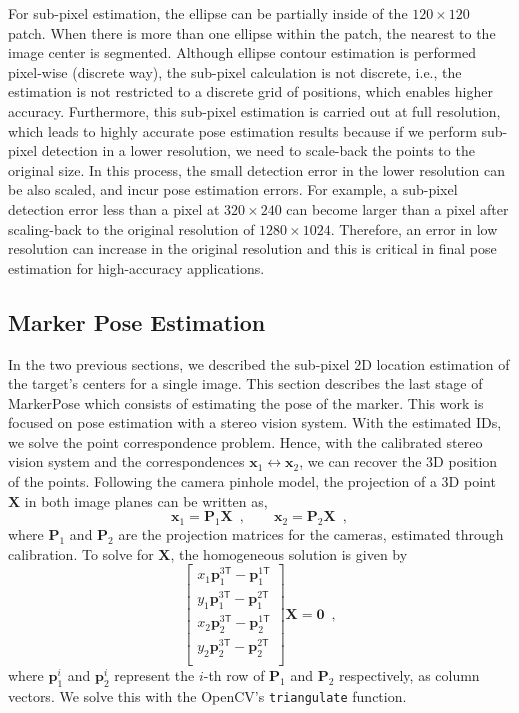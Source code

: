 \documentclass[final]{cvpr}
\begin{document}
For sub-pixel estimation, the ellipse can be partially inside of the $120 \times 120$ patch. When there is more than one ellipse within the patch, the nearest to the image center is segmented. Although ellipse contour estimation is performed pixel-wise (discrete way), the sub-pixel calculation is not discrete, i.e., the estimation is not restricted to a discrete grid of positions, which enables higher accuracy. Furthermore, this sub-pixel estimation is carried out at full resolution, which leads to highly accurate pose estimation results because if we perform sub-pixel detection in a lower resolution, we need to scale-back the points to the original size. In this process, the small detection error in the lower resolution can be also scaled, and incur pose estimation errors. For example, a sub-pixel detection error less than a pixel at $320 \times 240$ can become larger than a pixel after scaling-back to the original resolution of $1280\times 1024$. Therefore, an error in low resolution can increase in the original resolution and this is critical in final pose estimation for high-accuracy applications.



\subsection{Marker Pose Estimation}
In the two previous sections, we described the sub-pixel 2D location estimation of the target's centers for a single image. This section describes the last stage of MarkerPose which consists of estimating the pose of the marker. This work is focused on pose estimation with a stereo vision system. With the estimated IDs, we solve the point correspondence problem. Hence, with the calibrated stereo vision system and the correspondences $\mathbf{x}_1 \leftrightarrow  \mathbf{x}_2$, we can recover the 3D position of the points. Following the camera pinhole model, the projection of a 3D point $\mathbf{X}$ in both image planes can be written as,
%
\begin{equation}
    \mathbf{x}_1 =  \mathbf{P}_1 \mathbf{X} \enspace, \qquad 
    \mathbf{x}_2 =  \mathbf{P}_2 \mathbf{X} \enspace,
\end{equation}
%
where $\mathbf{P}_1$ and $\mathbf{P}_2$ are the projection matrices for the cameras, estimated through calibration. To solve for $\mathbf{X}$, the homogeneous solution is given by
%
\begin{equation}
    \begin{bmatrix}
    x_1\mathbf{p}_1^{3\mathsf{T}} -  \mathbf{p}_1^{1\mathsf{T}}\\
    y_1\mathbf{p}_1^{3\mathsf{T}} -  \mathbf{p}_1^{2\mathsf{T}}\\
    x_2\mathbf{p}_2^{3\mathsf{T}} -  \mathbf{p}_2^{1\mathsf{T}}\\
    y_2\mathbf{p}_2^{3\mathsf{T}} -  \mathbf{p}_2^{2\mathsf{T}}\\
    \end{bmatrix} \mathbf{X} = \mathbf{0} \enspace,
\end{equation}
%
where $\mathbf{p}_1^i$ and $\mathbf{p}_2^i$ represent the $i$-th row of $\mathbf{P}_1$ and $\mathbf{P}_2$ respectively, as column vectors. We solve this with the OpenCV's \texttt{triangulate} function.
\end{document}
